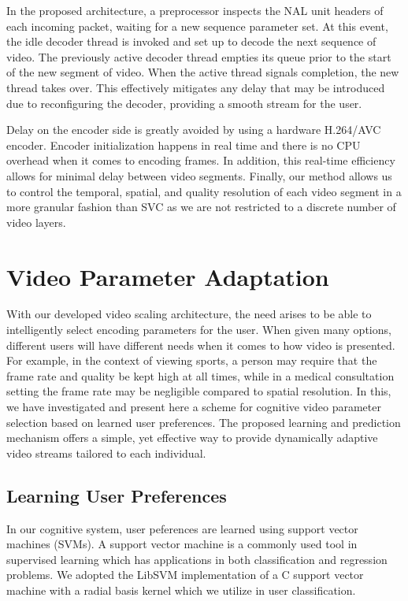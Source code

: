 In the proposed architecture, a preprocessor inspects the NAL unit headers of each incoming packet, waiting for a new sequence parameter set. At this event, the idle decoder thread is invoked and set up to decode the next sequence of video. The previously active decoder thread empties its queue prior to the start of the new segment of video. When the active thread signals completion, the new thread takes over. This effectively mitigates any delay that may be introduced due to reconfiguring the decoder, providing a smooth stream for the user.

Delay on the encoder side is greatly avoided by using a hardware H.264/AVC encoder. Encoder initialization happens in real time and there is no CPU overhead when it comes to encoding frames. In addition, this real-time efficiency allows for minimal delay between video segments. Finally, our method allows us to control the temporal, spatial, and quality resolution of each video segment in a more granular fashion than SVC as we are not restricted to a discrete number of video layers.  




\section{Video Parameter Adaptation}
\label{sec:UserProfiles}

With our developed video scaling architecture, the need arises to be able to intelligently select encoding parameters for the user. When given many options, different users will have different needs when it comes to how video is presented. For example, in the context of viewing sports, a person may require that the frame rate and quality be kept high at all times, while in a medical consultation setting the frame rate may be negligible compared to spatial resolution. In this, we have investigated and present here a scheme for cognitive video parameter selection based on learned user preferences. The proposed learning and prediction mechanism offers a simple, yet effective way to provide dynamically adaptive video streams tailored to each individual.

\subsection{Learning User Preferences}
In our cognitive system, user peferences are learned using support vector machines (SVMs). A support vector machine is a commonly used tool in supervised learning which has applications in both classification and regression problems. We adopted the LibSVM implementation of a C support vector machine with a radial basis kernel \cite{LibSVM} which we utilize in user classification.

